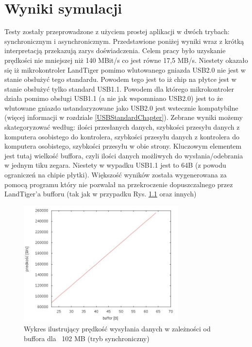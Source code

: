 \documentclass{BscUS}
\begin{document}
\chapter{Wyniki symulacji}
\label{resultsChapter}
Testy zostały przeprowadzone z użyciem prostej aplikacji w dwóch trybach: synchronicznym i asynchronicznym. Przedstawione poniżej wyniki wraz z krótką interpretacją przekazują zarys doświadczenia. Celem pracy było uzyskanie prędkości nie mniejszej niż 140 MBit/s co jest równe 17,5 MB/s.
\newline
\indent Niestety okazało się iż mikrokontroler LandTiger pomimo wlutowanego gniazda USB2.0 nie jest w stanie obsłużyć tego standardu. Powodem tego jest to iż chip na płytce jest w stanie obsłużyć tylko standard USB1.1.
\newline
\indent Powodem dla którego mikrokontroler działa pomimo obsługi USB1.1 (a nie jak wspomniano USB2.0) jest to że wlutowane gniazdo ustandaryzowane jako USB2.0 jest wstecznie kompatybilne (więcej informacji w rozdziale \ref{USBStandardChapter}).
\newline
\indent Zebrane wyniki możemy skategoryzować według: ilości przesłanych danych, szybkości przesyłu danych z komputera osobistego do kontrolera, szybkości przesyłu danych z kontrolera do komputera osobistego, szybkości przesyłu w obie strony. Kluczowym elementem jest tutaj wielkość buffora, czyli ilości danych możliwych do wysłania/odebrania w jednym tiku zegara. Niestety w wypadku USB1.1 jest to 64B (z powodu ograniczeń na chipie płytki). Większość wyników została wygenerowana za pomocą programu który nie pozwalał na przekroczenie dopuszczalnego przez LandTiger'a bufforu (tak jak w przypadku Rys. \ref{fig:S_107374200Send} oraz innych)
\newline
\begin{figure}[H]
{
\centering
\includegraphics[width=0.75\textwidth]{./img/S_107374200Send}
\caption{Wykres ilustrujący prędkość wysyłania danych w zależności od buffora dla ~102 MB (tryb synchroniczny)}
\label{fig:S_107374200Send}
}
\end{figure}
\end{document}
